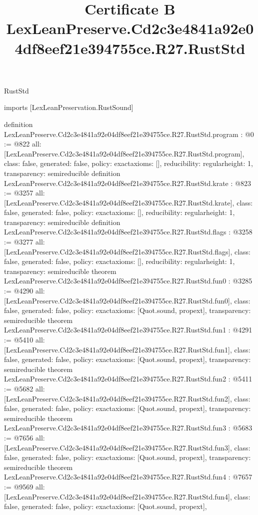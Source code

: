 \begin{lexlean}{RustStd}
\title{Certificate B LexLeanPreserve.Cd2c3e4841a92e04df8eef21e394755ce.R27.RustStd}
\begin{coremodule}
imports [LexLeanPreservation.RustSound]

definition LexLeanPreserve.Cd2c3e4841a92e04df8eef21e394755ce.R27.RustStd.program : @0 := @822 {
  all: [LexLeanPreserve.Cd2c3e4841a92e04df8eef21e394755ce.R27.RustStd.program],
  class: false,
  generated: false,
  policy: exact{axioms: []},
  reducibility: regular{height: 1},
  transparency: semireducible
}
definition LexLeanPreserve.Cd2c3e4841a92e04df8eef21e394755ce.R27.RustStd.krate : @823 := @3257 {
  all: [LexLeanPreserve.Cd2c3e4841a92e04df8eef21e394755ce.R27.RustStd.krate],
  class: false,
  generated: false,
  policy: exact{axioms: []},
  reducibility: regular{height: 1},
  transparency: semireducible
}
definition LexLeanPreserve.Cd2c3e4841a92e04df8eef21e394755ce.R27.RustStd.flags : @3258 := @3277 {
  all: [LexLeanPreserve.Cd2c3e4841a92e04df8eef21e394755ce.R27.RustStd.flags],
  class: false,
  generated: false,
  policy: exact{axioms: []},
  reducibility: regular{height: 1},
  transparency: semireducible
}
theorem LexLeanPreserve.Cd2c3e4841a92e04df8eef21e394755ce.R27.RustStd.fun0 : @3285 := @4290 {
  all: [LexLeanPreserve.Cd2c3e4841a92e04df8eef21e394755ce.R27.RustStd.fun0],
  class: false,
  generated: false,
  policy: exact{axioms: [Quot.sound, propext]},
  transparency: semireducible
}
theorem LexLeanPreserve.Cd2c3e4841a92e04df8eef21e394755ce.R27.RustStd.fun1 : @4291 := @5410 {
  all: [LexLeanPreserve.Cd2c3e4841a92e04df8eef21e394755ce.R27.RustStd.fun1],
  class: false,
  generated: false,
  policy: exact{axioms: [Quot.sound, propext]},
  transparency: semireducible
}
theorem LexLeanPreserve.Cd2c3e4841a92e04df8eef21e394755ce.R27.RustStd.fun2 : @5411 := @5682 {
  all: [LexLeanPreserve.Cd2c3e4841a92e04df8eef21e394755ce.R27.RustStd.fun2],
  class: false,
  generated: false,
  policy: exact{axioms: [Quot.sound, propext]},
  transparency: semireducible
}
theorem LexLeanPreserve.Cd2c3e4841a92e04df8eef21e394755ce.R27.RustStd.fun3 : @5683 := @7656 {
  all: [LexLeanPreserve.Cd2c3e4841a92e04df8eef21e394755ce.R27.RustStd.fun3],
  class: false,
  generated: false,
  policy: exact{axioms: [Quot.sound, propext]},
  transparency: semireducible
}
theorem LexLeanPreserve.Cd2c3e4841a92e04df8eef21e394755ce.R27.RustStd.fun4 : @7657 := @9569 {
  all: [LexLeanPreserve.Cd2c3e4841a92e04df8eef21e394755ce.R27.RustStd.fun4],
  class: false,
  generated: false,
  policy: exact{axioms: [Quot.sound, propext]},
}
\end{coremodule}
\end{lexlean}
